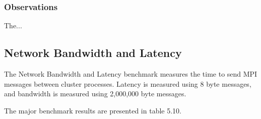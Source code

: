 \subsubsection{Observations}

The...


%
%
\subsection{Network Bandwidth and Latency}

The Network Bandwidth and Latency benchmark measures the time to send MPI messages between cluster processes. Latency is measured using 8 byte messages, and bandwidth is measured using 2,000,000 byte messages.

The major benchmark results are presented in table 5.10.

